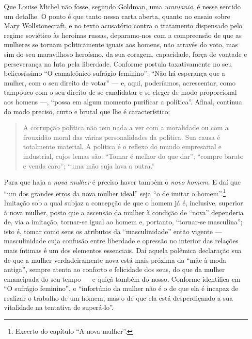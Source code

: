 Que Louise Michel não fosse, segundo Goldman, uma \textit{uraniania}, é nesse
sentido um detalhe. O ponto é que tanto nessa carta aberta, quanto no
ensaio sobre Mary Wollstonecraft, e no texto acusatório contra o
tratamento dispensado pelo regime soviético às heroínas russas,
deparamo-nos com a compreensão de que as mulheres se tornam
politicamente iguais aos homens, não através do voto, mas sim do seu
maravilhoso heroísmo, da sua coragem, capacidade, força de vontade e
perseverança na luta pela liberdade. Conforme postula taxativamente no
seu belicosíssimo ``O camaleônico sufrágio feminino'': ``Não há
esperança que a mulher, com o seu direito de votar'' --- e, aqui,
poderíamos, acrescentar, como tampouco com o seu direito de se
candidatar e se eleger de modo proporcional aos homens ---, ``possa em
algum momento purificar a política''. Afinal, continua do modo preciso,
curto e brutal que lhe é característico:

\begin{quote}
A corrupção política não tem nada a ver com a moralidade ou com a
frouxidão moral das várias personalidades da política. Sua causa é
totalmente material. A política é o reflexo do mundo empresarial e
industrial, cujos lemas são: ``Tomar é melhor do que dar''; ``compre
barato e venda caro''; ``uma mão suja lava a outra.''
\end{quote}

Para que haja a \textit{nova mulher} é preciso haver também o \textit{novo homem}. E
daí que ``um dos grandes erros da nova mulher ideal'' seja ``o de imitar
o homem''.\footnote{Excerto do capítulo ``A nova mulher''.} Imitação sob a qual subjaz a concepção de
que o homem já é, inclusive, superior à nova mulher, posto que a
ascensão da mulher à condição de ``nova'' dependeria de, via a imitação,
tornar-se igual ao homem e, portanto, ``tornar-se masculina''; isto é,
tomar como seus os atributos da ``masculinidade'' então vigente ---
masculinidade cuja confusão entre liberdade e opressão no interior das
relações mais íntimas é um dos elementos essenciais. Daí aquela polêmica
declaração sua de que a mulher verdadeiramente nova está mais próxima da
``mãe à moda antiga'', sempre atenta ao conforto e felicidade dos seus,
do que da mulher emancipada do seu tempo --- e quiçá também do nosso.
Conforme identifica em ``O sufrágio feminino'', o ``infortúnio da mulher
não é o de que ela é incapaz de realizar o trabalho de um homem, mas o
de que ela está desperdiçando a sua vitalidade na tentativa de
superá-lo''. 

